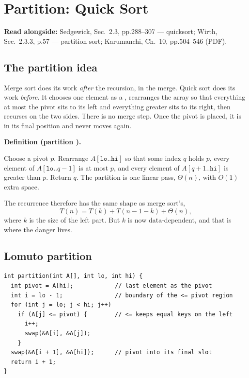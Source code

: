\documentclass[11pt]{article}
\newenvironment{definitionbox}[1]{%
  \par\noindent\textbf{Definition (#1).}\ \itshape
}{\par\vspace{0.3em}}
\begin{document}
\section{Partition: Quick Sort}

\textbf{Read alongside:} Sedgewick, Sec.~2.3, pp.288--307 --- quicksort; Wirth, Sec.~2.3.3, p.57 --- partition sort; Karumanchi, Ch.~10, pp.504--546 (PDF).

\subsection{The partition idea}

Merge sort does its work \emph{after} the recursion, in the merge. Quick sort does its work \emph{before}. It chooses one element as a , rearranges the array so that everything at most the pivot sits to its left and everything greater sits to its right, then recurses on the two sides. There is no merge step. Once the pivot is placed, it is in its final position and never moves again.

\begin{definitionbox}{partition \cite{Wirth2004_algorithms_data_structures,Sedgewick2011_algorithms}}
Choose a pivot $p$. Rearrange $A[\texttt{lo}..\texttt{hi}]$ so that some index $q$ holds $p$, every element of $A[\texttt{lo}..q-1]$ is at most $p$, and every element of $A[q+1..\texttt{hi}]$ is greater than $p$. Return $q$. The partition is one linear pass, $\Theta(n)$, with $O(1)$ extra space.
\end{definitionbox}

The recurrence therefore has the same shape as merge sort's,
\[
  T(n) = T(k) + T(n-1-k) + \Theta(n),
\]
where $k$ is the size of the left part. But $k$ is now data-dependent, and that is where the danger lives.

\subsection{Lomuto partition}

\begin{verbatim}
int partition(int A[], int lo, int hi) {
  int pivot = A[hi];            // last element as the pivot
  int i = lo - 1;               // boundary of the <= pivot region
  for (int j = lo; j < hi; j++)
    if (A[j] <= pivot) {        // <= keeps equal keys on the left
      i++;
      swap(&A[i], &A[j]);
    }
  swap(&A[i + 1], &A[hi]);      // pivot into its final slot
  return i + 1;
}
\end{verbatim}
\end{document}
